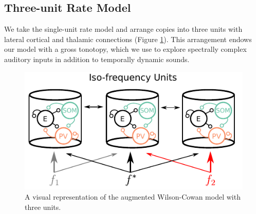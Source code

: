 \documentclass[a4paper,10pt]{article}
\begin{document}
\subsection{Three-unit Rate Model}\label{sec:awc3}
We take the single-unit rate model and arrange copies into three units with lateral cortical and thalamic connections (Figure \ref{fig:wc_space}). This arrangement endows our model with a gross tonotopy, which we  use to explore spectrally complex auditory inputs in addition to temporally dynamic sounds.

\begin{figure}[ht!]
\centering
\includegraphics[width=.75\textwidth]{col3.pdf}
\caption{A visual representation of the augmented Wilson-Cowan model with three units.}\label{fig:wc_space}
\end{figure}
\end{document}
